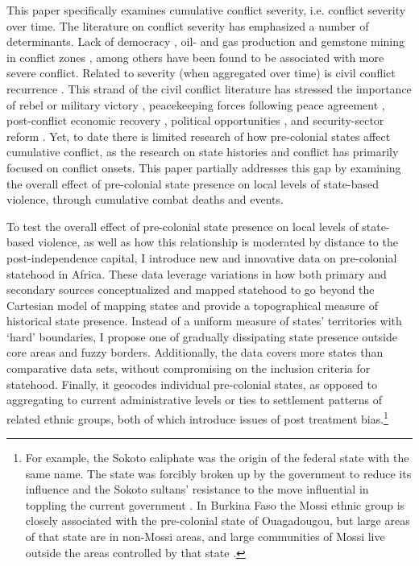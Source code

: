This paper specifically examines cumulative conflict severity, i.e. conflict
severity over time. The literature on conflict severity has emphasized a number
of determinants. Lack of democracy \citep{Lacina_2006}, oil- and gas production
and gemstone mining in conflict zones \citep{Lujala_2008}, among others have
been found to be associated with more severe conflict. Related to severity (when
aggregated over time) is civil conflict recurrence \citep{Collier2003b}. This
strand of the civil conflict literature has stressed the importance of rebel or
military victory \citep{Luttwak_1999, Quinn2007, Toft_2010}, peacekeeping forces
following peace agreement \citep{Collier_2008, Quinn2007}, post-conflict
economic recovery \citep{Collier_2008, Quinn2007}, political opportunities
\citep{Walter_2004}, and security-sector reform \citep{Toft_2009}. Yet, to date
there is limited research of how pre-colonial states affect cumulative conflict,
as the research on state histories and conflict has primarily focused on
conflict onsets. This paper partially addresses this gap by examining the
overall effect of pre-colonial state presence on local levels of state-based
violence, through cumulative combat deaths and events. 

To test the overall effect of pre-colonial state presence on local levels of
state-based violence, as well as how this relationship is moderated by distance
to the post-independence capital, I introduce new and innovative data on
pre-colonial statehood in Africa. These data leverage variations in how both
primary and secondary sources conceptualized and mapped statehood to go beyond
the Cartesian model of mapping states and provide a topographical measure of
historical state presence. Instead of a uniform measure of states' territories
with `hard' boundaries, I propose one of gradually dissipating state presence
outside core areas and fuzzy borders. Additionally, the data covers more states
than comparative data sets, without compromising on the inclusion criteria for
statehood. Finally, it geocodes individual pre-colonial states, as opposed to
aggregating to current administrative levels or ties to settlement patterns of
related ethnic groups, both of which introduce issues of post treatment
bias.\footnote{For example, the Sokoto caliphate was the origin of the federal
state with the same name. The state was forcibly broken up by the government to
reduce its influence and the Sokoto sultans' resistance to the move influential
in toppling the current government \citep{HiribarrenVincent2017AHoB}. In Burkina
Faso the Mossi ethnic group is closely associated with the pre-colonial state of
Ouagadougou, but large areas of that state are in non-Mossi areas, and large
communities of Mossi live outside the areas controlled by that state
\citep{Wishman2021a}.}

